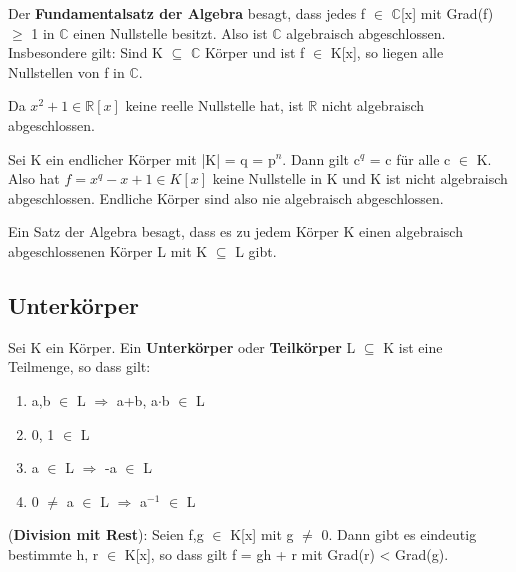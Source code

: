 \begin{remark}
\leavevmode
\begin{compactenum}
\item Der \textbf{Fundamentalsatz der Algebra} besagt, dass jedes f $\in$ $\mathbb{C}$[x] mit Grad(f) $\ge$ 1 in $\mathbb{C}$ einen Nullstelle besitzt. Also ist $\mathbb{C}$ algebraisch abgeschlossen. Insbesondere gilt: Sind K $\subseteq$ $\mathbb{C}$ Körper und ist f $\in$ K[x], so liegen alle Nullstellen von f in $\mathbb{C}$.
\item Da $x^2 + 1 \in \mathbb{R}[x]$ keine reelle Nullstelle hat, ist $\mathbb{R}$ nicht algebraisch abgeschlossen.
\item Sei K ein endlicher Körper mit |K| = q = p$^n$. Dann gilt c$^q$ = c für alle c $\in$ K. Also hat $f = x^q - x+1 \in K[x]$ keine Nullstelle in K und K ist nicht algebraisch abgeschlossen. Endliche Körper sind also nie algebraisch abgeschlossen.
\item Ein Satz der Algebra besagt, dass es zu jedem Körper K einen algebraisch abgeschlossenen Körper L mit K $\subseteq$ L gibt.
\end{compactenum}
\end{remark}

\subsection{Unterkörper}
\begin{definition}
Sei K ein Körper. Ein \textbf{Unterkörper} oder \textbf{Teilkörper} L $\subseteq$ K ist eine Teilmenge, so dass gilt:
\begin{enumerate}
\item a,b $\in$ L $\Rightarrow$ a+b, a$\cdot$b $\in$ L
\item 0, 1 $\in$ L
\item a $\in$ L $\Rightarrow$ -a $\in$ L
\item 0 $\neq$ a $\in$ L $\Rightarrow$ a$^{-1}$ $\in$ L
\end{enumerate}
\end{definition}

\begin{proposition}
(\textbf{Division mit Rest}): Seien f,g $\in$ K[x] mit g $\neq$ 0. Dann gibt es eindeutig bestimmte h, r $\in$ K[x], so dass gilt f = gh + r mit Grad(r) < Grad(g).
\end{proposition}

